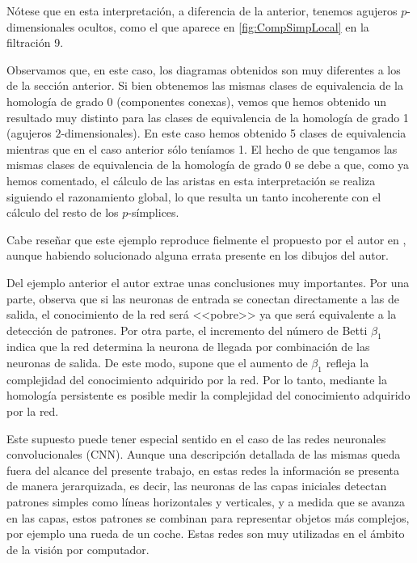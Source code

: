 \documentclass[12pt, a4paper, twoside]{book}
\numberwithin{equation}{section}
\theoremstyle{definition}
\newenvironment{ejem}
  {\pushQED{\qed}\renewcommand{\qedsymbol}{$\blacktriangleleft$}\ejemplo}
  {\popQED\endejemplo}
\theoremstyle{remark}
\theoremstyle{plain}
\begin{document}
\begin{ejem}
	Nótese que en esta interpretación, a diferencia de la anterior, 
	tenemos agujeros $p$-dimensionales ocultos, como el que aparece en 
	\autoref{fig:CompSimpLocal} en la filtración 9.

	Observamos que, en este caso, los diagramas obtenidos son muy 
	diferentes a los de la sección anterior. Si bien obtenemos las mismas 
	clases de equivalencia de la homología de grado 0 (componentes 
	conexas), vemos que hemos obtenido un resultado muy distinto para las
	clases de equivalencia de la homología de grado 1 (agujeros 
	$2$-dimensionales). En este caso hemos obtenido 5 clases de 
	equivalencia mientras que en el caso anterior sólo teníamos 1. El 
	hecho de que tengamos las mismas clases de equivalencia de la 
	homología de grado 0 se debe a que, como ya hemos comentado, el 
	cálculo de las aristas en esta interpretación se realiza siguiendo el
	razonamiento global, lo que resulta un tanto incoherente con el 
	cálculo del resto de los $p$-símplices. 

	Cabe reseñar que este ejemplo reproduce fielmente el propuesto por el 
	autor en \cite{Articulo-Watanabe}, aunque habiendo solucionado alguna 
	errata presente en los dibujos del autor.

	\end{ejem}

	Del ejemplo anterior el autor extrae unas conclusiones muy 
	importantes. Por una parte, observa que si las neuronas de entrada se 
	conectan directamente a las de salida, el conocimiento de la red será 
	<<pobre>> ya que será equivalente a la detección de patrones. Por otra 
	parte, el incremento del número de Betti $\beta_{1}$ indica que la red 
	determina la neurona de llegada por combinación de las neuronas de 
	salida. De este modo, supone que el aumento de $\beta_{1}$ refleja la 
	complejidad del conocimiento adquirido por la red. Por lo tanto, 
	mediante la homología persistente es posible medir la complejidad del 
	conocimiento adquirido por la red.

	Este supuesto puede tener especial sentido en el caso de las redes 
	neuronales convolucionales (CNN). Aunque una descripción detallada de 
	las mismas queda fuera del alcance del presente trabajo, en estas 
	redes la información se presenta de manera jerarquizada, es decir, las
	neuronas de las capas iniciales detectan patrones simples como líneas
	horizontales y verticales, y a medida que se avanza en las capas, 
	estos patrones se combinan para representar objetos más complejos, por 
	ejemplo una rueda de un coche. Estas redes son muy utilizadas en el 
	ámbito de la visión por computador.
\end{document}
